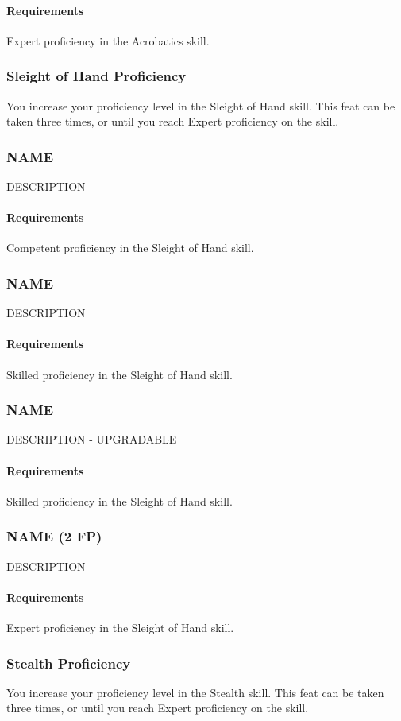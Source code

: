     \paragraph{Requirements} Expert proficiency in the Acrobatics skill.
\subsubsection{Sleight of Hand Proficiency} \label{feat::sleightofhandprof}
    You increase your proficiency level in the Sleight of Hand skill.
    This feat can be taken three times, or until you reach Expert proficiency on the skill.
\subsubsection{NAME} \label{feat::name}
    DESCRIPTION
    \paragraph{Requirements} Competent proficiency in the Sleight of Hand skill.
\subsubsection{NAME} \label{feat::name}
    DESCRIPTION
    \paragraph{Requirements} Skilled proficiency in the Sleight of Hand skill.
\subsubsection{NAME} \label{feat::name}
    DESCRIPTION - UPGRADABLE
    \paragraph{Requirements} Skilled proficiency in the Sleight of Hand skill.
\subsubsection{NAME (2 FP)} \label{feat::name}
    DESCRIPTION
    \paragraph{Requirements} Expert proficiency in the Sleight of Hand skill.
\subsubsection{Stealth Proficiency} \label{feat::stealthprof}
    You increase your proficiency level in the Stealth skill.
    This feat can be taken three times, or until you reach Expert proficiency on the skill.
